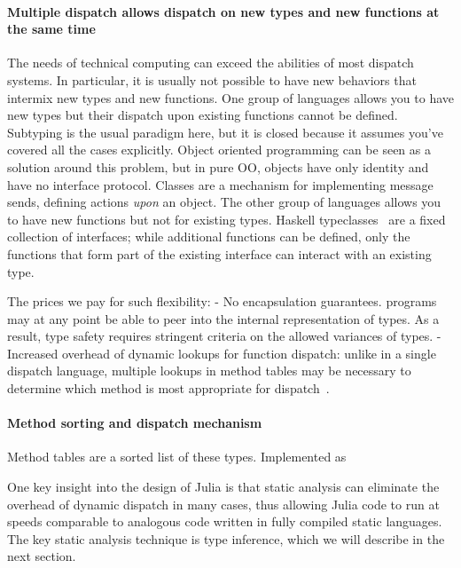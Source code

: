 \documentclass[pldi]{sigplanconf-pldi15}
\begin{document}
\paragraph{Multiple dispatch allows dispatch on new types and new functions at the same time}
The needs of technical computing can exceed the abilities of most dispatch
systems.  In particular, it is usually not possible to have new behaviors that
intermix new types and new functions.  One group of languages allows you to
have new types but their dispatch upon existing functions cannot be defined.
Subtyping is the usual paradigm here, but it is closed because it assumes
you've covered all the cases explicitly.  Object oriented programming can be
seen as a solution around this problem, but in pure OO, objects have only
identity and have no interface protocol.  Classes are a mechanism for
implementing message sends, defining actions \textit{upon} an object.  The
other group of languages allows you to have new functions but not for existing
types.  Haskell typeclasses~\cite{typeclass} are a fixed collection of
interfaces; while additional functions can be defined, only the functions that
form part of the existing interface can interact with an existing type.

The prices we pay for such flexibility:
- No encapsulation guarantees.  programs may at any point be able to peer into
the internal representation of types. As a result, type safety requires
stringent criteria on the allowed variances of types.
- Increased overhead of dynamic lookups for function dispatch: unlike in a single dispatch language, multiple lookups in method tables may be necessary to determine which method is most appropriate for dispatch~\cite{Bruce1995}.


\paragraph{Method sorting and dispatch mechanism}
Method tables are a sorted list of these types.
Implemented as 


One key insight into the design of Julia is that static analysis can eliminate
the overhead of dynamic dispatch in many cases, thus allowing Julia code to run
at speeds comparable to analogous code written in fully compiled static
languages. The key static analysis technique is type inference, which we will
describe in the next section.
\end{document}
